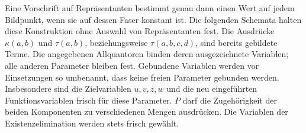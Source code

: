 \documentclass[main.tex]{subfiles}
\begin{document}


Eine Vorschrift auf Repräsentanten bestimmt genau dann einen Wert auf
jedem Bildpunkt, wenn sie auf dessen Faser konstant ist. Die folgenden
Schemata halten diese Konstruktion ohne Auswahl von Repräsentanten fest.
Die Ausdrücke \(\kappa(a,b)\) und \(\tau(a,b)\), beziehungsweise
\(\tau(a,b,c,d)\), sind bereits gebildete Terme. Die angegebenen
Allquantoren binden deren ausgezeichnete Variablen; alle anderen Parameter
bleiben fest. Gebundene Variablen werden vor Einsetzungen so umbenannt,
dass keine freien Parameter gebunden werden. Insbesondere sind die
Zielvariablen \(u,v,z,w\) und die neu eingeführten Funktionsvariablen
frisch für diese Parameter. \(P\) darf die Zugehörigkeit der beiden
Komponenten zu verschiedenen Mengen ausdrücken. Die Variablen der
Existenzelimination werden stets frisch gewählt.
\end{document}
